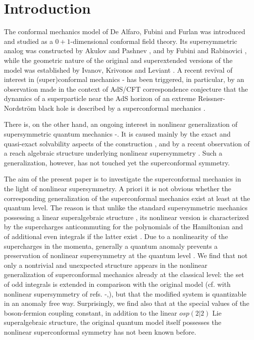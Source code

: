 \documentclass[a4paper,12pt]{article}
\begin{document}
\newpage
\section{\protect\bigskip Introduction}

The conformal mechanics model of De Alfaro, Fubini and
Furlan
\cite{AFF} was introduced and studied as a $0+1$-dimensional
conformal
field theory. Its
supersymmetric analog was constructed
by Akulov and Pashnev \cite{AP}, and by Fubini and
Rabinovici
\cite{FR},  while the geometric nature of the original
and superextended versions of the model was established by
Ivanov, Krivonos and Leviant \cite{IKL}.
A recent revival of interest
in (super)conformal mechanics \cite{BH}-\cite{LP}
has been  triggered, in particular, by an
observation made in the
context of AdS/CFT correspondence conjecture \cite{AdS}
that the dynamics of a superparticle near the AdS
horizon of an extreme Reissner-Nordstr\"om black hole
is described by a superconformal mechanics
\cite{BH}.

There is, on the other hand,  an ongoing interest in
nonlinear generalization
of supersymmetric
quantum mechanics \cite{AIS}-\cite{AS}.
It is
caused mainly by the  exact
and quasi-exact solvability aspects of
the construction \cite{KP1,A1,KP2},
and by a recent observation of a reach algebraic structure
underlying nonlinear supersymmetry \cite{KP3}.
Such a generalization, however, has not touched yet
the superconformal symmetry.

The aim of the present paper is to
investigate the superconformal mechanics
in the light of nonlinear supersymmetry.
A priori it is not obvious whether
the corresponding generalization
of the superconformal mechanics exist
at least at the quantum level.
The reason is that unlike the standard
supersymmetric mechanics
possessing a linear superalgebraic structure \cite{Wit},
its nonlinear version is characterized by
the supercharges anticommuting for the
polynomials of the Hamiltonian
and of additional  even integrals if the
latter exist \cite{KP3}.
Due to a nonlinearity of the supercharges in the momenta,
generally a quantum anomaly prevents
a preservation of nonlinear supersymmetry
at the quantum level \cite{P1,KP1}.
We find that not only a nontrivial and unexpected
structure appears in the nonlinear generalization of
superconformal mechanics
already at the classical level:
the set of odd integrals is extended in
comparison with the original model \cite{AP,FR}
(cf. with nonlinear supersymmetry
of refs. \cite{KP1}-\cite{KP4},\cite{AS}),
but that the modified system is quantizable
in an anomaly free way.
Surprisingly, we find also that
at the special values
of the boson-fermion coupling constant,
in addition to the linear  $osp(2|2)$
Lie superalgebraic structure,
the original quantum
model \cite{AP,FR} itself
possesses the nonlinear superconformal symmetry
has not been known before.
\end{document}
